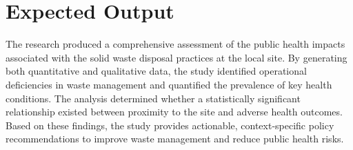 \section{Expected Output}
The research produced a comprehensive assessment of the public health impacts associated with the solid waste disposal practices at the local site. By generating both quantitative and qualitative data, the study identified operational deficiencies in waste management and quantified the prevalence of key health conditions. The analysis determined whether a statistically significant relationship existed between proximity to the site and adverse health outcomes. Based on these findings, the study provides actionable, context-specific policy recommendations to improve waste management and reduce public health risks.
